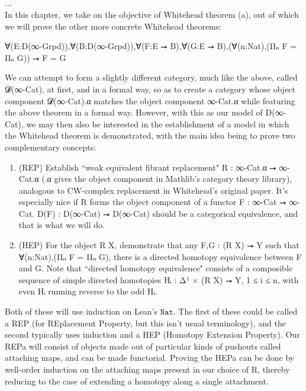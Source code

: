 \documentclass{book}
\theoremstyle{definition}
\newcounter{pcounter}
\newcounter{sectioncount}
\newcounter{subsectioncount}
\renewcommand{\section}[1]{\newpage\ \\ \ \\ \begin{center} \scalebox{1.5}{\texttt{\thesectioncount . #1}} \stepcounter{sectioncount} \setcounter{subsectioncount}{1} \end{center} \begin{center} \ \\ \ \\ \thispagestyle{empty} \end{center}}
\begin{document}
\section{Cubical Complexes}

...\\

\iffalse
In this chapter, we take on the objective of Whitehead theorem (a), out of which we will prove the other more concrete Whitehead theorems:\\

\begin{center} ∀(E:D(∞-Grpd)),∀(B:D(∞-Grpd)),∀(F:E ⭢ B),∀(G:E ⭢ B),(∀(n:Nat),(Πₙ F = Πₙ G)) ⭢ F = G
\end{center}

We can attempt to form a slightly different category, much like the above, called 𝓓(∞-Cat), at first, and in a formal way, so as to create a category whose object component 𝓓(∞-Cat).α matches the object component ∞-Cat.α while featuring the above theorem in a formal way. However, with this as our model of D(∞-Cat), we may then also be interested in the establishment of a model in which the Whitehead theorem is demonstrated, with the main idea being to prove two complementary concepts:

\begin{enumerate}
\item (REP) Establish ``weak equivalent fibrant replacement" R : ∞-Cat.α ⭢ ∞-Cat.α (.α gives the object component in Mathlib's category theory library), analogous to CW-complex replacement in Whitehead's original paper. It's especially nice if R forms the object component of a functor F : ∞-Cat ⭢ ∞-Cat. D(F) : D(∞-Cat) ⭢ D(∞-Cat) should be a categorical equivalence, and that is what we will do.
\item (HEP) For the object R X, demonstrate that any F,G : (R X) ⭢ Y such that ∀(n:Nat),(Π⃗ₙ F = Π⃗ₙ G), there is a directed homotopy equivalence between F and G. Note that ``directed homotopy equivalence" consists of a composible sequence of simple directed homotopies Hᵢ : Δ¹ × (R X) ⭢ Y, 1 ≤ i ≤ n, with even Hᵢ running reverse to the odd Hᵢ.
\end{enumerate} 

Both of these will use induction on Lean's $\texttt{Nat}$. The first of these could be called a REP (for REplacement Property, but this isn't usual terminology), and the second typically uses induction and a HEP (Homotopy Extension Property). Our REPa will consist of objects made out of particular kinds of pushouts called attaching maps, and can be made functorial. Proving the HEPa can be done by well-order induction on the attaching maps present in our choice of R, thereby reducing to the case of extending a homotopy along a single attachment.\\
\end{document}
